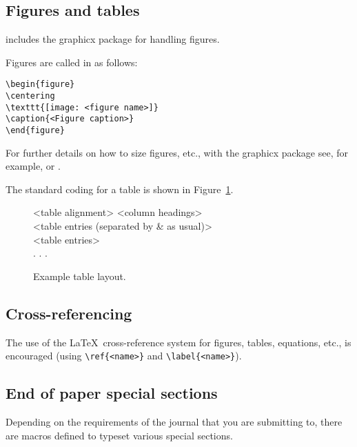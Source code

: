 \documentclass[Afour,sageh,times]{sagej}
\begin{document}
\subsection{Figures and tables} \textsf{\journalclass} includes the
\textsf{graphicx} package for handling figures.

Figures are called in as follows:
\begin{verbatim}
\begin{figure}
\centering
\texttt{[image: <figure name>]}
\caption{<Figure caption>}
\end{figure}
\end{verbatim}

For further details on how to size figures, etc., with the
\textsf{graphicx} package see, for example, \cite{R1}
or \cite{R3}.

The standard coding for a table is shown in Figure~\ref{F2}.

\begin{figure}
\setlength{\fboxsep}{0pt}%
\setlength{\fboxrule}{0pt}%
\begin{center}
\begin{boxedverbatim}
\begin{table}
\small\sf\centering
\caption{<Table caption.>}
\begin{tabular}{<table alignment>}
\toprule
<column headings>\\
\midrule
<table entries
(separated by & as usual)>\\
<table entries>\\
.
.
.\\
\bottomrule
\end{tabular}
\end{table}
\end{boxedverbatim}
\end{center}
\caption{Example table layout.\label{F2}}
\end{figure}

\subsection{Cross-referencing}
The use of the \LaTeX\ cross-reference system
for figures, tables, equations, etc., is encouraged
(using \verb"\ref{<name>}" and \verb"\label{<name>}").

\subsection{End of paper special sections}
Depending on the requirements of the journal that you are submitting to,
there are macros defined to typeset various special sections. \pagebreak
\end{document}
